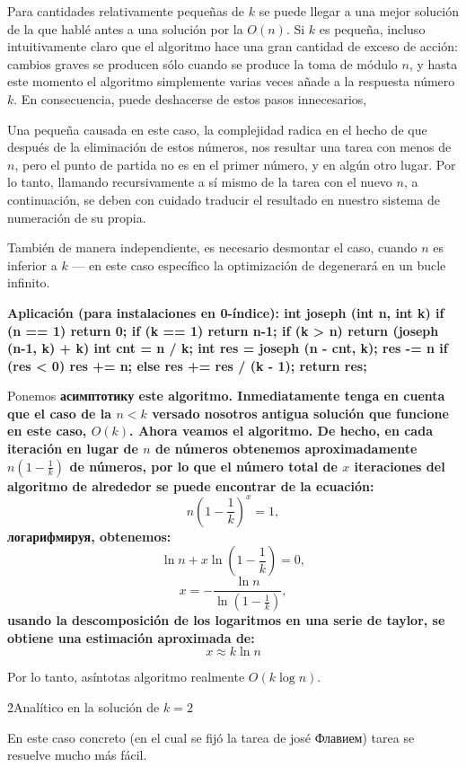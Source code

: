 Para cantidades relativamente pequeñas de $k$ se puede llegar a una mejor solución de la que hablé antes a una solución por la $O(n)$. Si $k$ es pequeña, incluso intuitivamente claro que el algoritmo hace una gran cantidad de exceso de acción: cambios graves se producen sólo cuando se produce la toma de módulo $n$, y hasta este momento el algoritmo simplemente varias veces añade a la respuesta número $k$. En consecuencia, puede deshacerse de estos pasos innecesarios, 

Una pequeña causada en este caso, la complejidad radica en el hecho de que después de la eliminación de estos números, nos resultar una tarea con menos de $n$, pero el punto de partida no es en el primer número, y en algún otro lugar. Por lo tanto, llamando recursivamente a sí mismo de la tarea con el nuevo $n$, a continuación, se deben con cuidado traducir el resultado en nuestro sistema de numeración de su propia.

También de manera independiente, es necesario desmontar el caso, cuando $n$ es inferior a $k$ --- en este caso específico la optimización de degenerará en un bucle infinito.

\bf{Aplicación} (para instalaciones en 0-índice):
\code
int joseph (int n, int k) {
if (n == 1) return 0;
if (k == 1) return n-1;
if (k > n) return (joseph (n-1, k) + k) %
int cnt = n / k;
int res = joseph (n - cnt, k);
res -= n %
if (res < 0) res += n;
else res += res / (k - 1);
return res;
}
\endcode

Ponemos \bf{асимптотику} este algoritmo. Inmediatamente tenga en cuenta que el caso de la $n < k$ versado nosotros antigua solución que funcione en este caso, $O(k)$. Ahora veamos el algoritmo. De hecho, en cada iteración en lugar de $n$ de números obtenemos aproximadamente $n \left( 1 - \frac{1}{k} \right)$ de números, por lo que el número total de $x$ iteraciones del algoritmo de alrededor se puede encontrar de la ecuación:
$$ n \left( 1 - \frac{1}{k} \right) ^ x = 1, $$
логарифмируя, obtenemos:
$$ \ln n + x \ln \left( 1 - \frac{1}{k} \right) = 0, $$
$$ x = - \frac{ \ln n }{ \ln \left( 1 - \frac{1}{k} \right) }, $$
usando la descomposición de los logaritmos en una serie de taylor, se obtiene una estimación aproximada de:
$$ x \approx k \ln n $$

Por lo tanto, asíntotas algoritmo realmente $O(k \log n)$.

\h2{Analítico en la solución de $k=2$}

En este caso concreto (en el cual se fijó la tarea de josé Флавием) tarea se resuelve mucho más fácil.

